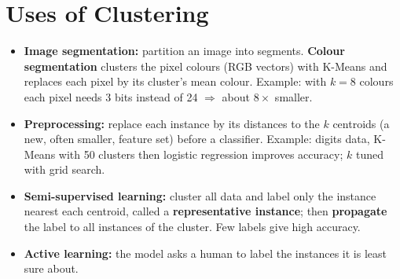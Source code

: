\section{Uses of Clustering}
\begin{itemize}
  \item \textbf{Image segmentation:} partition an image into segments. \textbf{Colour segmentation} clusters the pixel colours (RGB vectors) with K-Means and replaces each pixel by its cluster's mean colour. Example: with $k=8$ colours each pixel needs 3 bits instead of 24 $\Rightarrow$ about $8\times$ smaller.
  \item \textbf{Preprocessing:} replace each instance by its distances to the $k$ centroids (a new, often smaller, feature set) before a classifier. Example: digits data, K-Means with 50 clusters then logistic regression improves accuracy; $k$ tuned with grid search.
  \item \textbf{Semi-supervised learning:} cluster all data and label only the instance nearest each centroid, called a \textbf{representative instance}; then \textbf{propagate} the label to all instances of the cluster. Few labels give high accuracy.
  \item \textbf{Active learning:} the model asks a human to label the instances it is least sure about.
\end{itemize}

